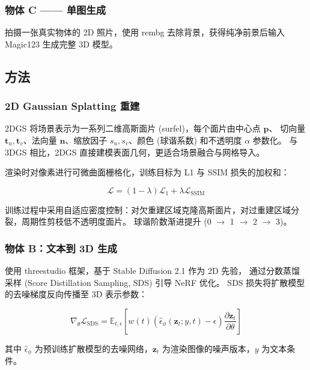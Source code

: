 \documentclass[12pt,a4paper]{ctexart}
\begin{document}
\subsubsection{物体 C —— 单图生成}
拍摄一张真实物体的 2D 照片，使用 rembg 去除背景，获得纯净前景后输入 Magic123 生成完整 3D 模型。

\subsection{方法}

\subsubsection{2D Gaussian Splatting 重建}

2DGS 将场景表示为一系列二维高斯面片 (surfel)\cite{huang20242dgs}，每个面片由中心点 $\mathbf{p}$、
切向量 $\mathbf{t}_u, \mathbf{t}_v$、法向量 $\mathbf{n}$、缩放因子 $s_u, s_v$、颜色 (球谐系数) 和不透明度 $\alpha$ 参数化。
与 3DGS\cite{kerbl20233dgs} 相比，2DGS 直接建模表面几何，更适合场景融合与网格导入。

渲染时对像素进行可微曲面栅格化，训练目标为 L1 与 SSIM 损失的加权和：

\begin{equation}
    \mathcal{L} = (1 - \lambda) \mathcal{L}_1 + \lambda \mathcal{L}_{\text{SSIM}}
\end{equation}

训练过程中采用自适应密度控制：对欠重建区域克隆高斯面片，对过重建区域分裂，周期性剪枝低不透明度面片。
球谐阶数渐进提升 (0 $\to$ 1 $\to$ 2 $\to$ 3)。

\subsubsection{物体 B：文本到 3D 生成}

使用 threestudio 框架，基于 Stable Diffusion 2.1 作为 2D 先验，
通过分数蒸馏采样 (Score Distillation Sampling, SDS)\cite{poole2022dreamfusion} 引导 NeRF 优化。
SDS 损失将扩散模型的去噪梯度反向传播至 3D 表示参数：

\begin{equation}
    \nabla_{\theta} \mathcal{L}_{\text{SDS}} = \mathbb{E}_{t, \epsilon} \left[ w(t) \left( \hat{\epsilon}_{\phi}(\mathbf{z}_t; y, t) - \epsilon \right) \frac{\partial \mathbf{z}_t}{\partial \theta} \right]
\end{equation}

其中 $\hat{\epsilon}_{\phi}$ 为预训练扩散模型的去噪网络，$\mathbf{z}_t$ 为渲染图像的噪声版本，$y$ 为文本条件。
\end{document}
